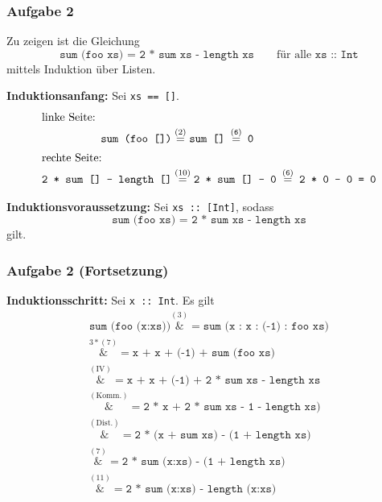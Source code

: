 \documentclass{beamer}
\newcommand{\step}[2][]{\ensuremath{\overset{{#1} (\text{#2})}{=}}}
\newcommand*{\astep}[2][]{\ensuremath{\overset{{#1} (\text{#2})}&{=}}}
\begin{document}
\begin{frame} \frametitle{Aufgabe 2}
	\scriptsize
	Zu zeigen ist die Gleichung
	\begin{equation*}
		\texttt{sum (foo xs) = 2 * sum xs - length xs} \qquad \text{für alle } \texttt{xs :: Int}
	\end{equation*}
	mittels Induktion über Listen.
	
	\textbf{Induktionsanfang:} Sei \texttt{xs == []}. 
	\begin{align*}
		\intertext{linke Seite: }
		\texttt{sum (foo [])} &\step{2} \texttt{sum [] \step{6} 0} \\
		\intertext{rechte Seite: }
		\texttt{2 * sum [] - length []} &\step{10} \texttt{2 * sum [] - 0 \step{6} 2 * 0 - 0 = 0}
	\end{align*}
	
	\textbf{Induktionsvoraussetzung:} Sei \texttt{xs :: [Int]}, sodass
	\begin{equation*}
		\texttt{sum (foo xs) = 2 * sum xs - length xs}
	\end{equation*}
	gilt.
\end{frame}

\begin{frame} \frametitle{Aufgabe 2 (Fortsetzung)}
	\scriptsize
	
	\textbf{Induktionsschritt:} Sei \texttt{x :: Int}. Es gilt
	\begin{align*}
		\texttt{sum (foo (x:xs))} \astep{3} \texttt{sum (x : x : (-1) : foo xs)} \\
		\astep[3*]{7} \texttt{x + x + (-1) + sum (foo xs)} \\
		\astep{IV} \texttt{x + x + (-1) + 2 * sum xs - length xs} \\
		\astep{Komm.} \texttt{2 * x + 2 * sum xs - 1 - length xs)} \\
		\astep{Dist.} \texttt{2 * (x + sum xs) - (1 + length xs)} \\
		\astep{7} \texttt{2 * sum (x:xs) - (1 + length xs)} \\
		\astep{11} \texttt{2 * sum (x:xs) - length (x:xs)} 
	\end{align*}
\end{frame}
\end{document}
